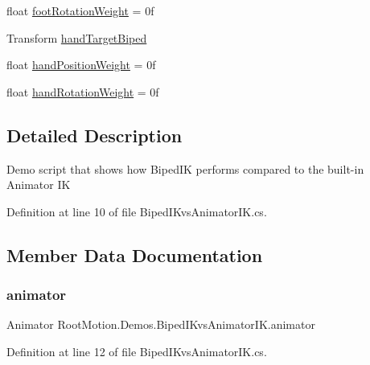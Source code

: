 \begin{DoxyCompactItemize}
\item 
float \mbox{\hyperlink{class_root_motion_1_1_demos_1_1_biped_i_kvs_animator_i_k_a54d8bbad93e1da9b046043092201708c}{foot\+Rotation\+Weight}} = 0f
\item 
Transform \mbox{\hyperlink{class_root_motion_1_1_demos_1_1_biped_i_kvs_animator_i_k_a6f77ce92350b29c97f5fd46ba943b7ea}{hand\+Target\+Biped}}
\item 
float \mbox{\hyperlink{class_root_motion_1_1_demos_1_1_biped_i_kvs_animator_i_k_a00c4318d3a631d711595a4b6e2e8e628}{hand\+Position\+Weight}} = 0f
\item 
float \mbox{\hyperlink{class_root_motion_1_1_demos_1_1_biped_i_kvs_animator_i_k_a5cbaf2454fc54be7e9b39e4a3fb17ca0}{hand\+Rotation\+Weight}} = 0f
\end{DoxyCompactItemize}


\subsection{Detailed Description}
Demo script that shows how Biped\+IK performs compared to the built-\/in Animator IK 



Definition at line 10 of file Biped\+I\+Kvs\+Animator\+I\+K.\+cs.



\subsection{Member Data Documentation}
\mbox{\label{class_root_motion_1_1_demos_1_1_biped_i_kvs_animator_i_k_a5820f87ced56c7497a9de3e2678810df}} 
\subsubsection{\texorpdfstring{animator}{animator}}
{\footnotesize\ttfamily Animator Root\+Motion.\+Demos.\+Biped\+I\+Kvs\+Animator\+I\+K.\+animator}



Definition at line 12 of file Biped\+I\+Kvs\+Animator\+I\+K.\+cs.

\mbox{\label{class_root_motion_1_1_demos_1_1_biped_i_kvs_animator_i_k_ab99880961d150a275bd044a6e55f1d22}} 
